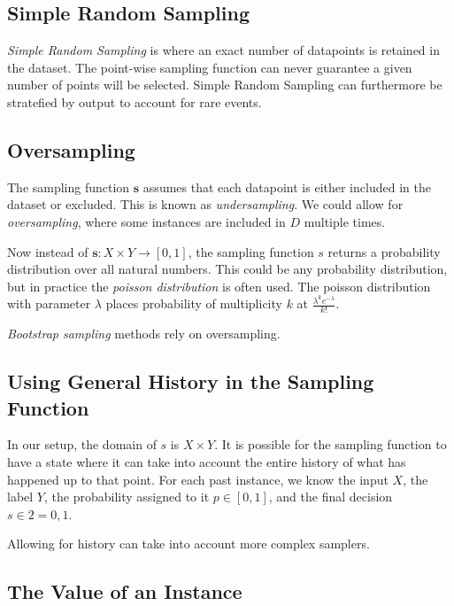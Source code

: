 \documentclass[twoside]{article}
\begin{document}
\subsection{Simple Random Sampling}

\textit{Simple Random Sampling} is where an exact number of datapoints is retained in the dataset. The point-wise sampling function can never guarantee a given number of points will be selected. Simple Random Sampling can furthermore be stratefied by output to account for rare events.

\subsection{Oversampling}

The sampling function \(\mathbf{s}\) assumes that each datapoint is either included in the dataset or excluded. This is known as \textit{undersampling}. We could allow for \textit{oversampling}, where some instances are included in \(D\) multiple times.

Now instead of \(\mathbf{s}: X \times Y \rightarrow \left [ 0, 1\right ]\), the sampling function \(s\) returns a probability distribution over all natural numbers. This could be any probability distribution, but in practice the \textit{poisson distribution} is often used. The poisson distribution with parameter \(\lambda\) places probability of multiplicity \(k\) at \(\frac{\lambda^k e^{-\lambda}}{k!}\).

\textit{Bootstrap sampling} methods rely on oversampling.

\subsection{Using General History in the Sampling Function}

In our setup, the domain of \(s\) is \(X \times Y\). It is possible for the sampling function to have a state where it can take into account the entire history of what has happened up to that point. For each past instance, we know the input \(X\), the label \(Y\), the probability assigned to it \(p \in \left [ 0, 1\right ]\), and the final decision \(s \in 2 = {0, 1}\).

Allowing for history can take into account more complex samplers.

\subsection{The Value of an Instance}
\end{document}
